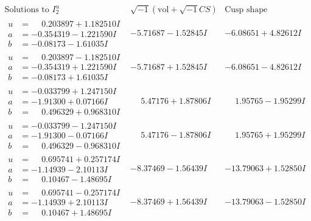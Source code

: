 \documentclass[1p]{elsarticle_modified}
\theoremstyle{definition}
\newcommand{\I}{\sqrt{-1}}
\begin{document}
$$\begin{array}{c|c|c}  
\text{Solutions to }I^u_{2}& \I (\text{vol} + \sqrt{-1}CS) & \text{Cusp shape}\\
 \hline 
\begin{aligned}
u &= \phantom{-}0.203897 + 1.182510 I \\
a &= -0.354319 - 1.221590 I \\
b &= -0.08173 - 1.61035 I\end{aligned}
 & -5.71687 - 1.52845 I & -6.08651 + 4.82612 I \\ \hline\begin{aligned}
u &= \phantom{-}0.203897 - 1.182510 I \\
a &= -0.354319 + 1.221590 I \\
b &= -0.08173 + 1.61035 I\end{aligned}
 & -5.71687 + 1.52845 I & -6.08651 - 4.82612 I \\ \hline\begin{aligned}
u &= -0.033799 + 1.247150 I \\
a &= -1.91300 + 0.07166 I \\
b &= \phantom{-}0.496329 + 0.968310 I\end{aligned}
 & \phantom{-}5.47176 + 1.87806 I & \phantom{-}1.95765 - 1.95299 I \\ \hline\begin{aligned}
u &= -0.033799 - 1.247150 I \\
a &= -1.91300 - 0.07166 I \\
b &= \phantom{-}0.496329 - 0.968310 I\end{aligned}
 & \phantom{-}5.47176 - 1.87806 I & \phantom{-}1.95765 + 1.95299 I \\ \hline\begin{aligned}
u &= \phantom{-}0.695741 + 0.257174 I \\
a &= -1.14939 - 2.10113 I \\
b &= \phantom{-}0.10467 - 1.48695 I\end{aligned}
 & -8.37469 - 1.56439 I & -13.79063 + 1.52850 I \\ \hline\begin{aligned}
u &= \phantom{-}0.695741 - 0.257174 I \\
a &= -1.14939 + 2.10113 I \\
b &= \phantom{-}0.10467 + 1.48695 I\end{aligned}
 & -8.37469 + 1.56439 I & -13.79063 - 1.52850 I \\ \hline\begin{aligned}

\end{aligned}
\end{array}$$
\end{document}
